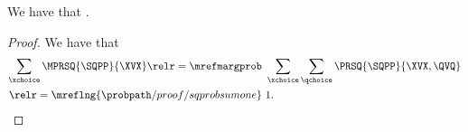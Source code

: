 \begin{proposition}
  We have that \sqmprobsumoneprop.%
\end{proposition}

\begin{proof}
  We have that
  \begin{align*}
    \sum_{\xchoice}\MPRSQ{\SQPP}{\XVX} \relr = {\mrefmargprob} &\ \sum_{\xchoice}\sum_{\qchoice}\PRSQ{\SQPP}{\XVX, \QVQ}\\
   \relr  = {\mreflng{\probpath/proof/sqprobsumone}} &\ 1.
  \end{align*}
\end{proof}
